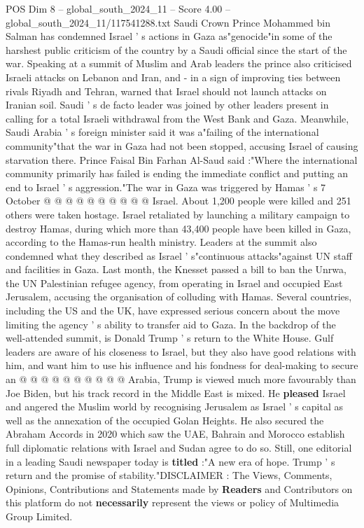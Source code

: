 \begin{textsample}{POS Dim 8 – global\_south\_2024\_11 – Score 4.00 – global\_south\_2024\_11/117541288.txt}  \label{ex:f8_pos_157}
Saudi Crown Prince Mohammed bin Salman has condemned Israel ' s actions in Gaza as"genocide"in some of the harshest public criticism of the country by a Saudi official since the start of the war.
Speaking at a summit of Muslim and Arab leaders the prince also criticised Israeli attacks on Lebanon and Iran, and - in a sign of improving ties between rivals Riyadh and Tehran, warned that Israel should not launch attacks on Iranian soil.
Saudi ' s de facto leader was joined by other leaders present in calling for a total Israeli withdrawal from the West Bank and Gaza.
Meanwhile, Saudi Arabia ' s foreign minister said it was a"failing of the international community"that the war in Gaza had not been stopped, accusing Israel of causing starvation there.
Prince Faisal Bin Farhan Al-Saud said :"Where the international community primarily has failed is ending the immediate conflict and putting an end to Israel ' s aggression."The war in Gaza was triggered by Hamas ' s 7 October @ @ @ @ @ @ @ @ @ @ Israel.
About 1,200 people were killed and 251 others were taken hostage.
Israel retaliated by launching a military campaign to destroy Hamas, during which more than 43,400 people have been killed in Gaza, according to the Hamas-run health ministry.
Leaders at the summit also condemned what they described as Israel ' s"continuous attacks"against UN staff and facilities in Gaza.
Last month, the Knesset passed a bill to ban the Unrwa, the UN Palestinian refugee agency, from operating in Israel and occupied East Jerusalem, accusing the organisation of colluding with Hamas.
Several countries, including the US and the UK, have expressed serious concern about the move limiting the agency ' s ability to transfer aid to Gaza.
In the backdrop of the well-attended summit, is Donald Trump ' s return to the White House.
Gulf leaders are aware of his closeness to Israel, but they also have good relations with him, and want him to use his influence and his fondness for deal-making to secure an @ @ @ @ @ @ @ @ @ @ Arabia, Trump is viewed much more favourably than Joe Biden, but his track record in the Middle East is mixed.
He \textbf{pleased} Israel and angered the Muslim world by recognising Jerusalem as Israel ' s capital as well as the annexation of the occupied Golan Heights.
He also secured the Abraham Accords in 2020 which saw the UAE, Bahrain and Morocco establish full diplomatic relations with Israel and Sudan agree to do so.
Still, one editorial in a leading Saudi newspaper today is \textbf{titled} :"A new era of hope.
Trump ' s return and the promise of stability."DISCLAIMER : The Views, Comments, Opinions, Contributions and Statements made by \textbf{Readers} and Contributors on this platform do not \textbf{necessarily} represent the views or policy of Multimedia Group Limited.

\end{textsample}
